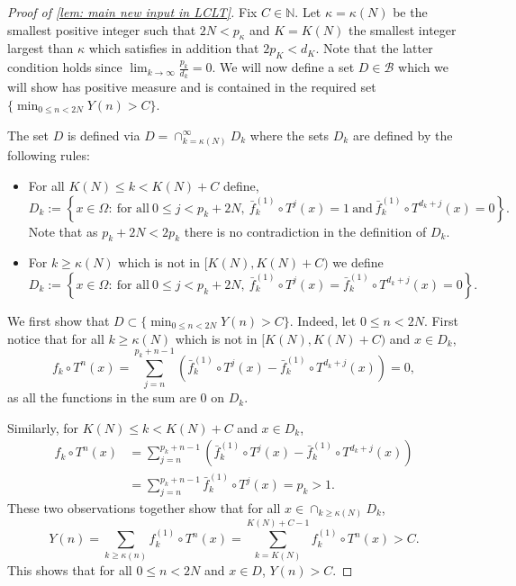 \documentclass[12pt,reqno]{amsart}
\newcommand{\N}{\mathbb{N}}
\newcommand{\B}{\mathcal{B}}
\theoremstyle{definition}
\begin{document}
\begin{proof}[Proof of \cref{lem: main new input in LCLT}]

Fix $C\in\N$. Let $\kappa=\kappa(N)$ be the smallest positive integer such that $2N<p_\kappa$ and $K=K(N)$ the smallest integer largest than $\kappa$ which satisfies in addition that $2p_K<d_K$. Note that the latter condition holds since $\lim_{k\to\infty}\frac{p_k}{d_k}=0$.  We will now define a set $D\in\B$ which we will show has positive measure and is contained in the required set $\{\min_{0\leq n<2N}Y(n)>C\}$. %

The set $D$ is defined via $D=\cap_{k=\kappa(N)}^\infty D_k$ where the sets $D_k$ are defined by the following rules: 
\begin{itemize}
    \item For all $K(N)\leq k<K(N)+C$ define,
\[
D_k:=\left\{x\in\Omega :\  \text{for all}\ 0\leq j< p_k+2N,\ \bar{f}_k^{(1)}\circ T^j(x)=1\ \text{and}\ \bar{f}_k^{(1)}\circ T^{d_k+j}(x)=0\right\}.
\]
Note that as $p_k+2N<2p_k$ there is no contradiction in the definition of $D_k$.
\vspace{3mm}
\item For $k\geq \kappa(N)$ which is not in $[K(N),K(N)+C)$ we define
\[
D_k:=\left\{x\in\Omega :\  \text{for all}\ 0\leq j< p_k+2N,\ \bar{f}_k^{(1)}\circ T^j(x)=\bar{f}_k^{(1)}\circ T^{d_k+j}(x)=0 \right\}.
\]
\end{itemize}

We first show that $D\subset \{\min_{0\leq n<2N}Y(n)>C\}$. Indeed, let $0\leq n < 2N$. First notice that for all $k\geq \kappa(N)$ which is not in $[K(N),K(N)+C)$ and $x\in D_k$, 
\[
f_k\circ T^{n}(x)=\sum_{j=n}^{p_k+n-1}\left(\bar{f}_k^{(1)}\circ T^{j}(x)-\bar{f}_k^{(1)}\circ T^{d_k+j}(x)\right)=0,
\]
as all the functions in the sum are $0$ on $D_k$. 

Similarly, for $K(N)\leq k<K(N)+C$ and $x\in D_k$,
\begin{align*}
f_k\circ T^{n}(x)&=\sum_{j=n}^{p_k+n-1}\left(\bar{f}_k^{(1)}\circ T^{j}(x)-\bar{f}_k^{(1)}\circ T^{d_k+j}(x)\right)\\
&=\sum_{j=n}^{p_k+n-1}\bar{f}_k^{(1)}\circ T^{j}(x)=p_k>1.
\end{align*}
These two observations together show that for all $x\in \cap_{k\geq \kappa(N)} D_k$,
\[
Y(n)=\sum_{k\geq \kappa(n)}f_k^{(1)}\circ T^n(x)=\sum_{k=K(N)}^{K(N)+C-1} f_k^{(1)}\circ T^n(x)>C.
\]
This shows that for all $0\leq n<2N$ and $x\in D$, $Y(n)>C$. 


\end{proof}
\end{document}
